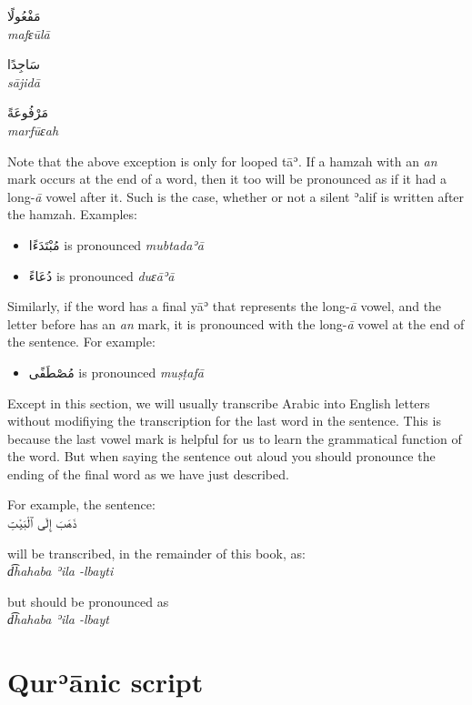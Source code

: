\documentclass[
  10pt,
]{book}
\providecommand{\tightlist}{%
  \setlength{\itemsep}{0pt}\setlength{\parskip}{0pt}}
\begin{document}
\foreignlanguage{arabic}{مَفْعُولًا}\\
\emph{mafɛūlā}

\foreignlanguage{arabic}{سَاجِدًا}\\
\emph{sājidā}

\foreignlanguage{arabic}{مَرْفُوعَةً}\\
\emph{marfūɛah}

Note that the above exception is only for looped tāʾ. If a hamzah with an \emph{an} mark occurs at the end of a word, then it too will be pronounced as if it had a long-\emph{ā} vowel after it. Such is the case, whether or not a silent ʾalif is written after the hamzah. Examples:

\begin{itemize}
\tightlist
\item
  \foreignlanguage{arabic}{مُبْتَدَءًا} is pronounced \emph{mubtadaʾā}
\item
  \foreignlanguage{arabic}{دُعَاءً} is pronounced \emph{duɛāʾā}
\end{itemize}

Similarly, if the word has a final yāʾ that represents the long-\emph{ā} vowel, and the letter before has an \emph{an} mark, it is pronounced with the long-\emph{ā} vowel at the end of the sentence. For example:

\begin{itemize}
\tightlist
\item
  \foreignlanguage{arabic}{مُصْطَفًى} is pronounced \emph{muṣṭafā}
\end{itemize}

Except in this section, we will usually transcribe Arabic into English letters without modifiying the transcription for the last word in the sentence. This is because the last vowel mark is helpful for us to learn the grammatical function of the word. But when saying the sentence out aloud you should pronounce the ending of the final word as we have just described.

For example, the sentence:\\
\foreignlanguage{arabic}{ذَهَبَ إِلَى ٱلْبَيْتِ}

will be transcribed, in the remainder of this book, as:\\
\emph{d͡hahaba ʾila -lbayti}

but should be pronounced as\\
\emph{d͡hahaba ʾila -lbayt}

\section{Qurʾānic script}\label{qureanic-script}
\end{document}
